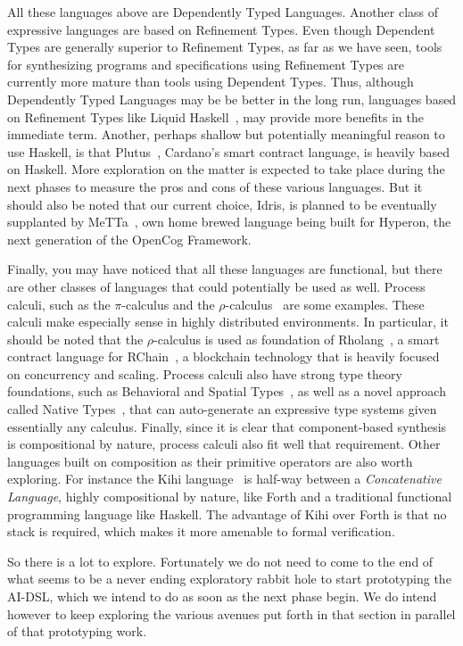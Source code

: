 \documentclass[]{report}
\begin{document}
All these languages above are Dependently Typed Languages.  Another
class of expressive languages are based on Refinement Types.  Even
though Dependent Types are generally superior to Refinement Types, as
far as we have seen, tools for synthesizing programs and
specifications using Refinement Types are currently more mature than
tools using Dependent Types.  Thus, although Dependently Typed
Languages may be be better in the long run, languages based on
Refinement Types like Liquid Haskell~\cite{Vazou2014}, may provide
more benefits in the immediate term.  Another, perhaps shallow but
potentially meaningful reason to use Haskell, is that
Plutus~\cite{Plutus2022}, Cardano's smart contract language, is
heavily based on Haskell.  More exploration on the matter is expected
to take place during the next phases to measure the pros and cons of
these various languages.  But it should also be noted that our current
choice, Idris, is planned to be eventually supplanted by
MeTTa~\cite{Warrell2022}, own home brewed language being built for
Hyperon, the next generation of the OpenCog Framework.

Finally, you may have noticed that all these languages are functional,
but there are other classes of languages that could potentially be
used as well.  Process calculi, such as the $\pi$-calculus and the
$\rho$-calculus~\cite{Meredith2005} are some examples.  These calculi
make especially sense in highly distributed environments.  In
particular, it should be noted that the $\rho$-calculus is used as
foundation of Rholang~\cite{Rholang2021}, a smart contract language
for RChain~\cite{RChain2021}, a blockchain technology that is heavily
focused on concurrency and scaling.  Process calculi also have strong
type theory foundations, such as Behavioral and Spatial
Types~\cite{Caires2004}, as well as a novel approach called Native
Types~\cite{Williams2021}, that can auto-generate an expressive type
systems given essentially any calculus.  Finally, since it is clear
that component-based synthesis is compositional by nature, process
calculi also fit well that requirement.  Other languages built on
composition as their primitive operators are also worth exploring.
For instance the Kihi language~\cite{Timothy2018} is half-way between
a \emph{Concatenative Language}, highly compositional by nature, like
Forth and a traditional functional programming language like Haskell.
The advantage of Kihi over Forth is that no stack is required, which
makes it more amenable to formal verification.

So there is a lot to explore.  Fortunately we do not need to come to
the end of what seems to be a never ending exploratory rabbit hole to
start prototyping the AI-DSL, which we intend to do as soon as the
next phase begin.  We do intend however to keep exploring the various
avenues put forth in that section in parallel of that prototyping
work.
\end{document}
